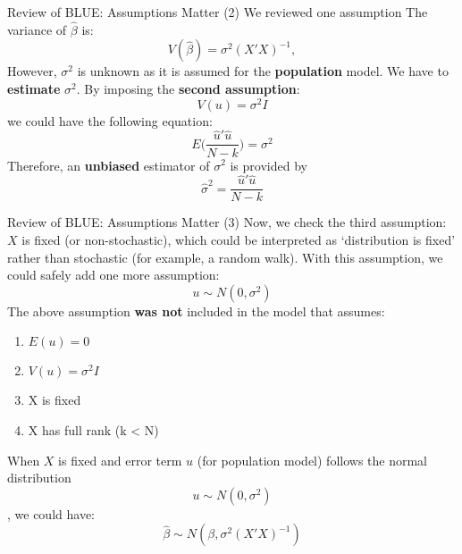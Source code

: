 \documentclass[aspectratio=169, t]{beamer}
\begin{document}
\begin{frame}{Review of BLUE: Assumptions Matter (2)}
    We reviewed one assumption
    The variance of $\hat{\beta}$ is:
    \begin{equation*}
        V(\hat{\beta}) = \sigma^2(X'X)^{-1},
    \end{equation*}
    However, $\sigma^{2}$ is unknown as it is assumed for the \textbf{population}
    model. We have to \textbf{estimate} $\sigma^2$. By imposing the \textbf{second assumption}:
    \begin{equation*}
        V(u) = \sigma^2 I
    \end{equation*}
    we could have the following equation:
    \begin{equation*}
        E\Big( \frac{\hat{u}'\hat{u}}{N-k} \Big ) = \sigma^2 
    \end{equation*}
    Therefore, an \textbf{unbiased} estimator of $\sigma^2$ is provided by
    \begin{equation*}
        \hat{\sigma}^2 = \frac{\hat{u}'\hat{u}}{N-k} 
    \end{equation*}
\end{frame}

\begin{frame}{Review of BLUE: Assumptions Matter (3)}
    Now, we check the third assumption: $X$ is fixed (or non-stochastic), which
    could be interpreted as `distribution is fixed' rather than stochastic (for
    example, a random walk). With this assumption, we could safely add one more
    assumption:
    \begin{equation*}
        u \sim N(0, \sigma^2)
    \end{equation*}
    The above assumption \textbf{was not} included in the model that assumes:
    \begin{enumerate}
        \item $E(u) = 0$
        \item $V(u) = \sigma^2 I$
        \item X is fixed 
        \item X has full rank (k < N)
    \end{enumerate}
    When $X$ is fixed and error term $u$ (for population model) follows the normal distribution
    $$u \sim N(0, \sigma^2)$$, we could have: 
    \begin{equation*}
        \hat{\beta} \sim N(\beta, \sigma^2(X'X)^{-1})
    \end{equation*}
\end{frame}
\end{document}
